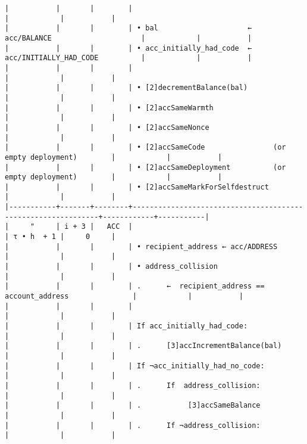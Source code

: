 \documentclass[varwidth=\maxdimen,margin=0.5cm,multi={verbatim}]{standalone}
\begin{document}
\begin{verbatim}
|           |       |        |                                                              |            |           |
|           |       |        | • bal                     ←  acc/BALANCE                     |            |           |
|           |       |        | • acc_initially_had_code  ←  acc/INITIALLY_HAD_CODE          |            |           |
|           |       |        |                                                              |            |           |
|           |       |        | • [2]decrementBalance(bal)                                   |            |           |
|           |       |        | • [2]accSameWarmth                                           |            |           |
|           |       |        | • [2]accSameNonce                                            |            |           |
|           |       |        | • [2]accSameCode                (or empty deployment)        |            |           |
|           |       |        | • [2]accSameDeployment          (or empty deployment)        |            |           |
|           |       |        | • [2]accSameMarkForSelfdestruct                              |            |           |
|-----------+-------+--------+--------------------------------------------------------------+------------+-----------|
|     "     | i + 3 |   ACC  |                                                              | τ • h  + 1 |     0     |
|           |       |        | • recipient_address ← acc/ADDRESS                            |            |           |
|           |       |        | • address_collision                                          |            |           |
|           |       |        | .      ←  recipient_address == account_address               |            |           |
|           |       |        |                                                              |            |           |
|           |       |        | If acc_initially_had_code:                                   |            |           |
|           |       |        | .      [3]accIncrementBalance(bal)                           |            |           |
|           |       |        | If ¬acc_initially_had_no_code:                               |            |           |
|           |       |        | .      If  address_collision:                                |            |           |
|           |       |        | .           [3]accSameBalance                                |            |           |
|           |       |        | .      If ¬address_collision:                                |            |           |

\end{verbatim}
\end{document}
